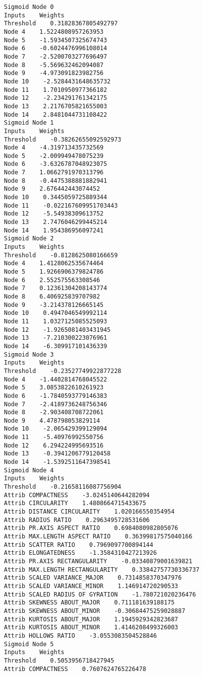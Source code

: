 \documentclass[
	article,			%
	11pt,				%
	oneside,			%
	a4paper,			%
	english,			%
	brazil,				%
	sumario=tradicional
	]{abntex2}
\begin{document}
\begin{lstlisting}
Sigmoid Node 0
Inputs    Weights
Threshold    0.31828367805492797
Node 4    1.5224808957263953
Node 5    -1.5934507325674743
Node 6    -0.6024476996108014
Node 7    -2.5200703277696497
Node 8    -5.569632462094087
Node 9    -4.973091823982756
Node 10    -2.5284431648635732
Node 11    1.7010950977366182
Node 12    -2.234291761342175
Node 13    2.2176705821655003
Node 14    2.8481044731108422
Sigmoid Node 1
Inputs    Weights
Threshold    -0.38262655092592973
Node 4    -4.319713435732569
Node 5    -2.009949478075239
Node 6    -3.6326787048923075
Node 7    1.0662791970313796
Node 8    -0.4475388881882941
Node 9    2.676442443074452
Node 10    0.3445059725889344
Node 11    -0.022167609951703443
Node 12    -5.54938309613752
Node 13    2.7476046299445214
Node 14    1.954386956097241
Sigmoid Node 2
Inputs    Weights
Threshold    -0.8128625080166659
Node 4    1.4128062535674464
Node 5    1.9266906379824786
Node 6    2.552575563308546
Node 7    0.12361304208143774
Node 8    6.406925839707982
Node 9    -3.214378126665145
Node 10    0.4947046549992114
Node 11    1.0327125085525093
Node 12    -1.9265081403431945
Node 13    -7.210300223076961
Node 14    -6.309917101436339
Sigmoid Node 3
Inputs    Weights
Threshold    -0.23527749922877228
Node 4    -1.4402814768045522
Node 5    3.0853822610261923
Node 6    -1.7840593779146383
Node 7    -2.4189736248756346
Node 8    -2.903408708722061
Node 9    4.478798053829114
Node 10    -2.065429399129094
Node 11    -5.40976992550756
Node 12    6.294224995693516
Node 13    -0.3941206779120458
Node 14    -1.5392511647398541
Sigmoid Node 4
Inputs    Weights
Threshold    -0.21658116087756904
Attrib COMPACTNESS    -3.0245140644282094
Attrib CIRCULARITY    1.4808664715433675
Attrib DISTANCE CIRCULARITY    1.020166550354954
Attrib RADIUS RATIO    0.2963495728531606
Attrib PR.AXIS ASPECT RATIO    0.6984080982805076
Attrib MAX.LENGTH ASPECT RATIO    0.36399817575040166
Attrib SCATTER RATIO    0.7969097700894144
Attrib ELONGATEDNESS    -1.3584310427213926
Attrib PR.AXIS RECTANGULARITY    -0.03340879001639821
Attrib MAX.LENGTH RECTANGULARITY    0.33842757730336737
Attrib SCALED VARIANCE_MAJOR    0.7314858370347976
Attrib SCALED VARIANCE_MINOR    1.146914720290533
Attrib SCALED RADIUS OF GYRATION    -1.780721020236476
Attrib SKEWNESS ABOUT_MAJOR    0.711181639188175
Attrib SKEWNESS ABOUT_MINOR    -0.30684475259028887
Attrib KURTOSIS ABOUT_MAJOR    1.1945929342823687
Attrib KURTOSIS ABOUT_MINOR    1.4146208499326003
Attrib HOLLOWS RATIO    -3.0553083504528846
Sigmoid Node 5
Inputs    Weights
Threshold    0.5053956718427945
Attrib COMPACTNESS    0.7607624765226478

\end{lstlisting}
\end{document}
